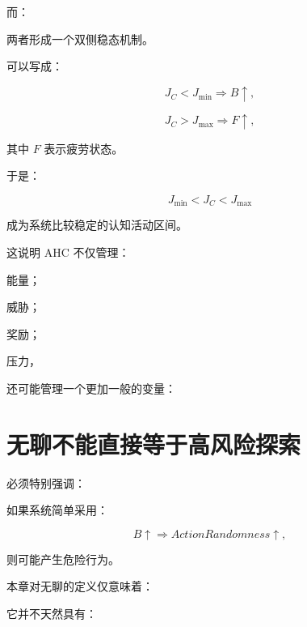 而：

\begin{statementbox}
\centering
{}
\end{statementbox}

两者形成一个双侧稳态机制。

可以写成：

\[
J_C<J_{\min}
\Rightarrow
B\uparrow,
\]

\[
J_C>J_{\max}
\Rightarrow
F\uparrow,
\]

其中 $F$ 表示疲劳状态。

于是：

\[
\boxed{
J_{\min}
<
J_C
<
J_{\max}
}
\]

成为系统比较稳定的认知活动区间。

这说明 AHC 不仅管理：

能量；

威胁；

奖励；

压力，

还可能管理一个更加一般的变量：

\begin{statementbox}
\centering
{}
\end{statementbox}

\section{无聊不能直接等于高风险探索}

必须特别强调：

\begin{statementbox}
\centering
{}
\end{statementbox}

如果系统简单采用：

\[
B\uparrow
\Rightarrow
ActionRandomness\uparrow,
\]

则可能产生危险行为。

本章对无聊的定义仅意味着：

\begin{statementbox}
\centering
{}
\end{statementbox}

它并不天然具有：

